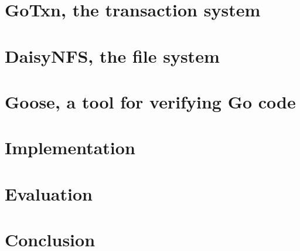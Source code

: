 \documentclass[11pt,twoside,final]{mitthesis}
\begin{document}
\chapter{GoTxn, the transaction system}%
\label{ch:txn}


\chapter{DaisyNFS, the file system}%
\label{ch:daisy-nfs}


\chapter{Goose, a tool for verifying Go code}%
\label{ch:goose}


\chapter{Implementation}%
\label{ch:impl}


\chapter{Evaluation}%
\label{ch:eval}


\chapter{Conclusion}%
\label{ch:conclusion}



\begin{spacing}{1}
{}

\end{spacing}
\end{document}
